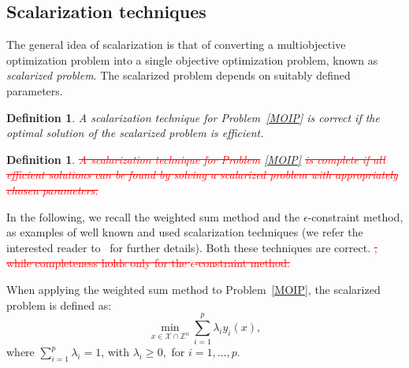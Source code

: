 \documentclass[preprint,12pt]{elsarticle}
\newcommand{\red}[1]{\textcolor{red}{#1}}
\newtheorem{definition}[theorem]{Definition}
\newtheorem{assumption}[theorem]{Assumption}
\def\Z{\mathbb{Z}}
\begin{document}

\subsection{Scalarization techniques}\label{sec:scal}
The general idea of scalarization is that of converting a multiobjective optimization problem into a single objective optimization problem, known as \emph{scalarized problem}.
The scalarized problem depends on suitably defined parameters.
\begin{definition}\label{def:correct}
 A scalarization technique for Problem~\eqref{MOIP} is correct if the optimal solution of the scalarized problem is efficient.
\end{definition}
\begin{definition}\label{def:complete}
 \red{\st{A scalarization technique for Problem }\eqref{MOIP}\st{ is complete if all efficient solutions can be found by solving a scalarized problem with appropriately chosen parameters.}}
\end{definition}
In the following, we recall the weighted sum method and the $\epsilon$-constraint method, as examples of well known and used scalarization techniques (we refer the interested reader
to~\cite{ehrgott2005multicriteria, miettinen1999nonlinear} for further details).
Both these techniques are correct. \red{\st{, while completeness holds only for the $\epsilon$-constraint method.}}

When applying the weighted sum method to Problem~\eqref{MOIP}, the scalarized problem is defined as:
 \begin{equation}\label{prob:weight}
  \min_{x\in \mathcal{X}\cap \Z^n} \sum_{i=1}^p \lambda_i y_i(x),
 \end{equation}
 where $\sum_{i=1}^p \lambda_i = 1$, with  $\lambda_i\geq 0,$\; for $i=1,\ldots,p$.
 
\end{document}
